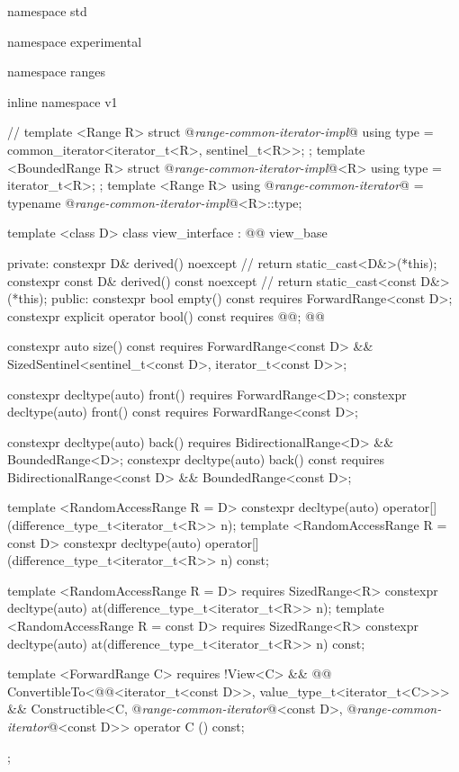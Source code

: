 %
\begin{codeblock}
namespace std { namespace experimental { namespace ranges { inline namespace v1
{
  // \expos
  template <Range R>
  struct @\textit{range-common-iterator-impl}@ {
    using type = common_iterator<iterator_t<R>, sentinel_t<R>>;
  };
  template <BoundedRange R>
  struct @\textit{range-common-iterator-impl}@<R> {
    using type = iterator_t<R>;
  };
  template <Range R>
    using @\textit{range-common-iterator}@ =
      typename @\textit{range-common-iterator-impl}@<R>::type;

  template <class D>
  class view_interface : @@ view_base {
  private:
    constexpr D& derived() noexcept { // \expos
      return static_cast<D&>(*this);
    }
    constexpr const D& derived() const noexcept { // \expos
      return static_cast<const D&>(*this);
    }
  public:
    constexpr bool empty() const requires ForwardRange<const D>;
    constexpr explicit operator bool() const
      requires @@;
    @@

    constexpr auto size() const requires ForwardRange<const D> &&
      SizedSentinel<sentinel_t<const D>, iterator_t<const D>>;

    constexpr decltype(auto) front() requires ForwardRange<D>;
    constexpr decltype(auto) front() const requires ForwardRange<const D>;

    constexpr decltype(auto) back()
      requires BidirectionalRange<D> && BoundedRange<D>;
    constexpr decltype(auto) back() const
      requires BidirectionalRange<const D> && BoundedRange<const D>;

    template <RandomAccessRange R = D>
      constexpr decltype(auto) operator[](difference_type_t<iterator_t<R>> n);
    template <RandomAccessRange R = const D>
      constexpr decltype(auto) operator[](difference_type_t<iterator_t<R>> n) const;

    template <RandomAccessRange R = D>
        requires SizedRange<R>
      constexpr decltype(auto) at(difference_type_t<iterator_t<R>> n);
    template <RandomAccessRange R = const D>
        requires SizedRange<R>
      constexpr decltype(auto) at(difference_type_t<iterator_t<R>> n) const;

    template <ForwardRange C>
        requires !View<C> && @@
          ConvertibleTo<@@<iterator_t<const D>>, value_type_t<iterator_t<C>>> &&
          Constructible<C, @\textit{range-common-iterator}@<const D>, @\textit{range-common-iterator}@<const D>>
      operator C () const;
  };
}}}}
\end{codeblock}

